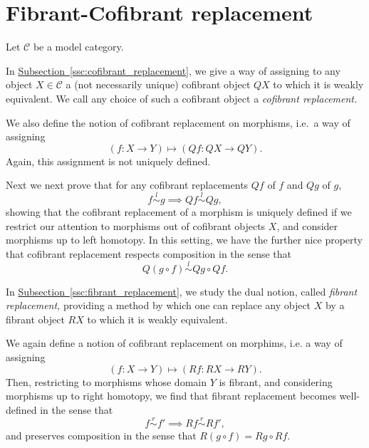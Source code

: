 \documentclass[main.tex]{subfiles}
\begin{document}
\section{Fibrant-Cofibrant replacement}
\label{sec:fibrant_cofibrant_replacement}

Let $\mathcal{C}$ be a model category.

In \hyperref[ssc:cofibrant_replacement]{Subsection~\ref*{ssc:cofibrant_replacement}}, we give a way of assigning to any object $X \in \mathcal{C}$ a (not necessarily unique) cofibrant object $QX$ to which it is weakly equivalent. We call any choice of such a cofibrant object a \emph{cofibrant replacement.}

We also define the notion of cofibrant replacement on morphisms, i.e.\ a way of assigning
\begin{equation*}
  (f\colon X \to Y) \mapsto (Qf\colon QX \to QY).
\end{equation*}
Again, this assignment is not uniquely defined.

Next we next prove that for any cofibrant replacements $Qf$ of $f$ and $Qg$ of $g$,
\begin{equation*}
  f \overset{l}{\sim} g \implies Qf \overset{l}{\sim} Qg,
\end{equation*}
showing that the cofibrant replacement of a morphism is uniquely defined if we restrict our attention to morphisms out of cofibrant objects $X$, and consider morphisms up to left homotopy. In this setting, we have the further nice property that cofibrant replacement respects composition in the sense that
\begin{equation*}
  Q(g \circ f) \overset{l}{\sim} Qg \circ Qf.
\end{equation*}

In \hyperref[ssc:fibrant_replacement]{Subsection~\ref*{ssc:fibrant_replacement}}, we study the dual notion, called \emph{fibrant replacement,} providing a method by which one can replace any object $X$ by a fibrant object $RX$ to which it is weakly equivalent.

We again define a notion of cofibrant replacement on morphims, i.e. a way of assigning
\begin{equation*}
  (f\colon X \to Y) \mapsto (Rf\colon RX \to RY).
\end{equation*}
Then, restricting to morphisms whose domain $Y$ is fibrant, and considering morphisms up to right homotopy, we find that fibrant replacement becomes well-defined in the sense that
\begin{equation*}
  f \overset{r}{\sim} f' \implies Rf \overset{r}{\sim} Rf',
\end{equation*}
and preserves composition in the sense that $R(g \circ f) = Rg \circ Rf$.
\end{document}
